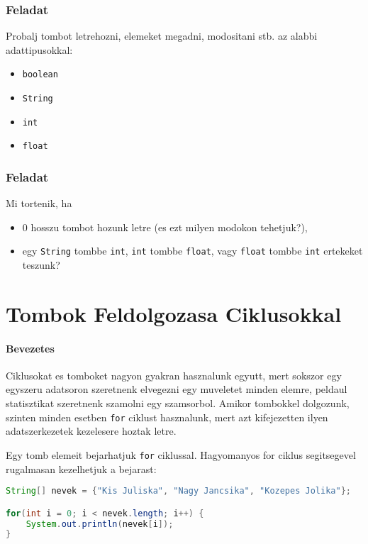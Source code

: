 \documentclass{article}
\begin{document}
\subsubsection{Feladat}

Probalj tombot letrehozni, elemeket megadni, modositani stb. az alabbi adattipusokkal:

\begin{itemize}
    \item \lstinline{boolean}
    \item \lstinline{String}
    \item \lstinline{int}
    \item \lstinline{float}
\end{itemize}

\subsubsection{Feladat}

Mi tortenik, ha

\begin{itemize}
    \item 0 hosszu tombot hozunk letre (es ezt milyen modokon tehetjuk?),
    \item egy \lstinline{String} tombbe \lstinline{int}, \lstinline{int} tombbe \lstinline{float}, vagy \lstinline{float} tombbe \lstinline{int} ertekeket teszunk?
\end{itemize}


\section{Tombok Feldolgozasa Ciklusokkal}

\paragraph{Bevezetes}

Ciklusokat es tomboket nagyon gyakran hasznalunk egyutt, mert sokszor egy egyszeru adatsoron szeretnenk elvegezni egy muveletet minden elemre, peldaul statisztikat szeretnenk szamolni egy szamsorbol. Amikor tombokkel dolgozunk, szinten minden esetben \lstinline{for} ciklust hasznalunk, mert azt kifejezetten ilyen adatszerkezetek kezelesere hoztak letre.

Egy tomb elemeit bejarhatjuk \lstinline{for} ciklussal. Hagyomanyos for ciklus segitsegevel rugalmasan kezelhetjuk a bejarast:
\begin{lstlisting}[language=Java, caption=Tomb elemeinek megjelenitese]
String[] nevek = {"Kis Juliska", "Nagy Jancsika", "Kozepes Jolika"};

for(int i = 0; i < nevek.length; i++) {
    System.out.println(nevek[i]);
}
\end{lstlisting}
\end{document}
